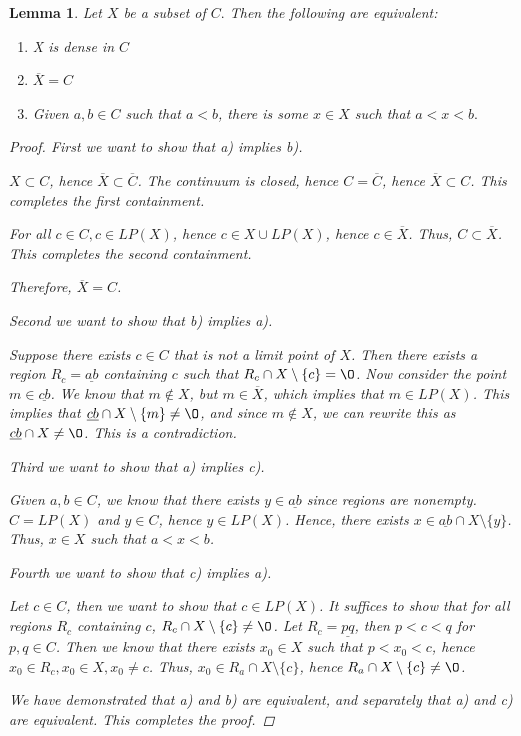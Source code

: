 \documentclass[11pt]{article}
\renewcommand{\emptyset}{\O}
\newtheorem{lemma}[theorem]{Lemma}
\theoremstyle{definition}
\numberwithin{equation}{subsection}
\begin{document}
\begin{lemma} Let $X$ be a subset of $C.$ Then the following are equivalent:
\begin{enumerate}
\item[a)] X is dense in $C$
\item[b)]$\overline{X} = C$
\item[c)] Given $a,b \in C$ such that $a<b$, there is some $x\in X$ such that $a<x<b.$
\end{enumerate} 
\begin{proof}
First we want to show that a) implies b).

$X \subset C$, hence $\overline{X} \subset \overline{C}$. The continuum is closed, hence $C = \overline{C}$, hence $\overline{X} \subset C$. This completes the first containment.

For all $c \in C, c \in LP(X)$, hence $c \in X \cup LP(X)$, hence $c \in \overline{X}$. Thus, $C \subset \overline{X}$. This completes the second containment.

Therefore, $\overline{X} = C$. 

Second we want to show that b) implies a).

Suppose there exists $c\in C$ that is not a limit point of $X$. Then there exists a region $R_c = \underline{ab}$ containing $c$ such that $R_c \cap X \setminus \{c\} = \emptyset$. Now consider the point $m \in \underline{cb}$. We know that $m \notin X$, but $m \in \overline{X}$, which implies that $m \in LP(X)$. This implies that $\underline{cb} \cap X \setminus \{m\} \neq \emptyset$, and since $m \notin X$, we can rewrite this as $\underline{cb} \cap X \neq \emptyset$. This is a contradiction.

Third we want to show that a) implies c).

Given $a,b \in C$, we know that there exists $y \in \underline{ab}$ since regions are nonempty. $C = LP(X)$ and $y \in C$, hence $y \in LP(X)$. Hence, there exists $x \in \underline{ab} \cap X \setminus \{y\}$. Thus, $x \in X$ such that $a<x<b$. 

Fourth we want to show that c) implies a).

Let $c \in C$, then we want to show that $c \in LP(X)$. It suffices to show that for all regions $R_c$ containing $c$, $R_c \cap X \setminus \{c\} \neq \emptyset$. Let $R_c = \underline{pq}$, then $p<c<q$ for $p,q \in C$. Then we know that there exists $x_0 \in X$ such that $p<x_0<c$, hence $x_0 \in R_c, x_0 \in X, x_0 \neq c$. Thus, $x_0 \in R_a \cap X \setminus \{c\}$, hence $R_a \cap X \setminus \{c\} \neq \emptyset$.

We have demonstrated that a) and b) are equivalent, and separately that a) and c) are equivalent. This completes the proof.

\renewcommand\qedsymbol{QED}
\end{proof}
\end{lemma}
\end{document}
